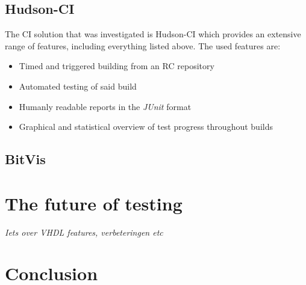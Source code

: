\documentclass[11pt,british]{article}
\begin{document}
\subsection{Hudson-CI}
\label{subsec:Hudson}
The \gls{CI} solution that was investigated is Hudson-CI which provides an extensive range of features, including everything listed above. The used features are:
\begin{itemize}
\item Timed and triggered building from an \gls{RC} repository
\item Automated testing of said build
\item Humanly readable reports in the \emph{JUnit} format
\item Graphical and statistical overview of test progress throughout builds
\end{itemize}

\subsection{BitVis}
\label{subsec:bitvis}

\newpage{}
\section{The future of testing}
\emph{\color{red} Iets over VHDL features, verbeteringen etc}

\newpage{}
\section{Conclusion}

\pagebreak{}

\printbibliography

\newpage{}
\end{document}
